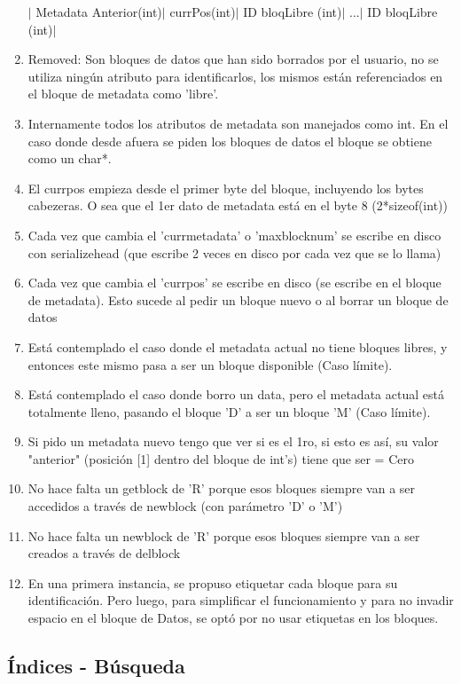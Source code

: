 \documentclass[a4paper,10pt]{article}
\begin{document}
\begin{enumerate}
$\vert$ Metadata Anterior(int)$\vert$ currPos(int)$\vert$ ID bloqLibre (int)$\vert$ ...$\vert$ ID bloqLibre (int)$\vert$ 
\item Removed: Son bloques de datos que han sido borrados por el usuario, no se utiliza ningún atributo para identificarlos, los mismos están referenciados en el bloque de metadata como 'libre'.
\item Internamente todos los atributos de metadata son manejados como int. En el caso donde desde afuera se piden los bloques de datos el bloque se obtiene como un char*.
\item El currpos empieza desde el primer byte del bloque, incluyendo los bytes cabezeras. O sea que el 1er dato de metadata está en el byte 8 (2*sizeof(int))
\item Cada vez que cambia el 'currmetadata' o 'maxblocknum' se escribe en disco con serializehead (que escribe 2 veces en disco por cada vez que se lo llama)
\item Cada vez que cambia el 'currpos' se escribe en disco (se escribe en el bloque de metadata). Esto sucede al pedir un bloque nuevo o al borrar un bloque de datos
\item Está contemplado el caso donde el metadata actual no tiene bloques libres, y entonces este mismo pasa a ser un bloque disponible (Caso límite).
\item Está contemplado el caso donde borro un data, pero el metadata actual está totalmente lleno, pasando el bloque 'D' a ser un bloque 'M' (Caso límite).
\item Si pido un metadata nuevo tengo que ver si es el 1ro, si esto es así, su valor "anterior" (posición [1] dentro del bloque de int's) tiene que ser = Cero
\item No hace falta un getblock de 'R' porque esos bloques siempre van a ser accedidos a través de newblock (con parámetro 'D' o 'M')
\item No hace falta un newblock de 'R' porque esos bloques siempre van a ser creados a través de delblock
\item En una primera instancia, se propuso etiquetar cada bloque para su identificación. Pero luego, para simplificar el funcionamiento y para no invadir espacio en el bloque de Datos, se optó por no usar etiquetas en los bloques.
\end{enumerate}


\subsection{Índices - Búsqueda}
\end{document}
